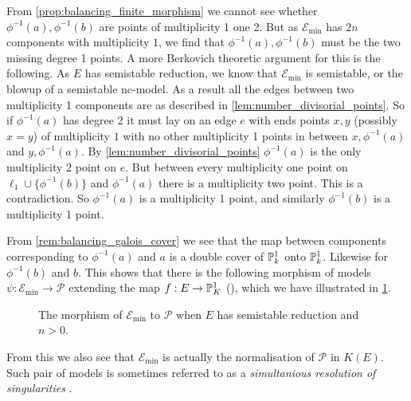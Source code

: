 From \cref{prop:balancing_finite_morphism} we cannot see whether $\phi^{-1}(a), \phi^{-1}(b)$ are points of multiplicity 1 one 2. 
But as $\mathscr E_\text{min} $ has $2n$ components with multiplicity $1$, we find that  $\phi^{-1}(a), \phi^{-1}(b)$ must be the two missing degree 1 points. 
A more Berkovich theoretic argument for this is the following. 
As $E$ has semistable reduction, we know that $\mathscr E_\text{min} $ is semistable, or the blowup of a semistable nc-model. 
As a result all the edges between two multiplicity 1 components are as described in \cref{lem:number_divisorial_points}.
So if $\phi ^{-1}(a)$ has degree 2 it must lay on an edge $e$ with ends points $x, y$ (possibly $x = y$) of multiplicity $1$ with no other multiplicity 1 points in between $x, \phi^{-1}(a)$ and $y, \phi^{-1}(a)$. 
By \cref{lem:number_divisorial_points} $\phi^{-1}(a)$ is the only multiplicity 2 point on $e$. 
But between every multiplicity one point on $\ell_1 \cup \{\phi^{-1}(b)\} $ and $\phi^{-1}(a)$ there is a multiplicity two point. 
This is a contradiction. 
So $\phi^{-1}(a)$ is a multiplicity 1 point, and similarly $\phi^{-1}(b)$ is a multiplicity 1 point.  


From \cref{rem:balancing_galois_cover} we see that the map between components corresponding to $\phi^{-1}(a)$ and $a$ is a double cover of $\mathbb{P}^{1}_k$ onto $\mathbb{P}^{1}_k$.
Likewise for $\phi^{-1}(b)$ and $b$. 
This shows that there is the following morphism of models $\psi: \mathscr E_\text{min} \to \mathscr P$ extending the map $f: E \to \mathbb{P}^{1}_K$ (\cite[thm.\ 8.3.20]{liuAlgebraicGeometryArithmetic2002}), which we have illustrated in \cref{fig:morphism_models_semistable_tame}.

\begin{figure}[ht]
    \centering
    \caption{The morphism of $\mathscr E_\text{min} $ to  $\mathscr P$ when $E$ has semistable reduction and $n > 0$.}
    \label{fig:morphism_models_semistable_tame}
\end{figure}
From this we also see that $\mathscr E_\text{min} $ is actually the normalisation of $\mathscr P$ in $K(E)$. 
Such pair of models is sometimes referred to as a \emph{simultanious resolution of singularities} \cite[sec.\ 6]{liuModelsCurvesFinitea}.

